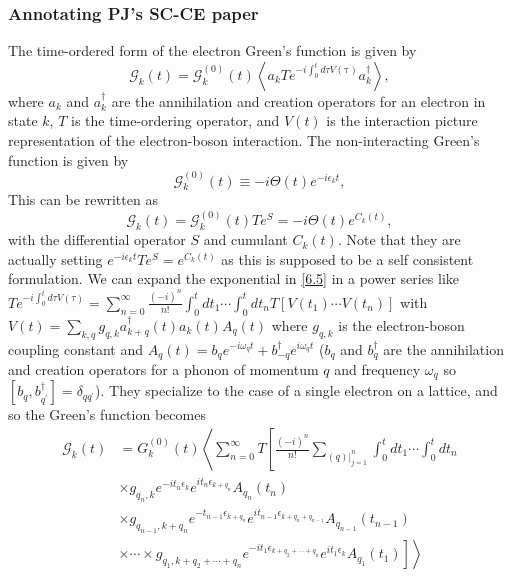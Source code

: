 \subsubsection{Annotating PJ's SC-CE paper}
 The time-ordered form of the electron Green's function is given by
\begin{equation}
\mathcal{G}_k(t)=\mathcal{G}_k^{(0)}(t)\left\langle a_k T e^{-i \int_0^t d \tau V(\mathrm{\tau})} a_k^\dag\right\rangle,
\label{6.5}
\end{equation}
where $a_k$ and $a_k^\dag$ are the annihilation and creation operators for an electron in state $k$, $T$ is the time-ordering operator, and $V(t)$ is the interaction picture representation of the electron-boson interaction. The non-interacting Green's function is given by
\begin{equation}
\mathcal{G}_k^{(0)}(t) \equiv-i \Theta(t) e^{-i \epsilon_k t},
\end{equation}
This can be rewritten as
\begin{equation}
\mathcal{G}_k(t)=\mathcal{G}_k^{(0)}(t) T e^S = -i \Theta(t) e^{C_k(t)},
\end{equation}
with the differential operator $S$ and cumulant $C_k(t)$. Note that they are actually setting $e^{-i \epsilon_k t}Te^S = e^{C_k(t)}$ as this is supposed to be a self consistent formulation. We can expand the exponential in \ref{6.5} in a power series like $T e^{-i \int_0^t d \tau V(\tau)}=\sum_{n=0}^{\infty} \frac{(-i)^n}{n!} \int_0^t d t_1 \cdots \int_0^t d t_n T\left[V ( t _ { 1 } ) \cdots V \left(t_n\right)\right]$ with $V(t)=\sum_{k, q} g_{q, k} a_{k+q}^{\dagger}(t) a_k(t) A_q(t)$ where $g_{q,k}$ is the electron-boson coupling constant and $A_q(t)=b_q e^{-i \omega_q t}+b_{-q}^\dagger e^{i \omega_q t}$ ($b_q$ and $b_q^\dagger$ are the annihilation and creation operators for a phonon of momentum $q$ and frequency $\omega_q$ so $[b_q, b_{q^{\prime}}^{\dagger}]=\delta_{q q^{\prime}}$).
They specialize to the case of a single electron on a lattice, and so the Green's function becomes
\begin{align}
\mathcal{G}_k(t)&=G_k^{(0)}(t)\left\langle \sum_{n=0}^{\infty} T\left[\frac{(-i)^n}{n!} \sum_{\left.(q)\right|_{j=1} ^n} \int_0^t d t_1 \cdots \int_0^t d t_n\right.\right.\\
&\times g_{q_n, k} e^{-i t_n \epsilon_k} e^{i t_n \epsilon _{k+q_{n}}} A_{q_n}\left(t_n\right) \\
&\times g_{q_{n-1}, k+q_n} e^{-t_{n-1} \epsilon_{k+q_n}} e^{i t_{n-1} \epsilon_{k+q_n+q_{n-1}}} A_{q_{n-1}}\left(t_{n-1}\right) \\
&\left.\left.\times \cdots \times g_{q_1, k+q_2+\cdots+q_n} e^{-i t_1 \epsilon_{k+q_2+\cdots+q_n}} e^{i t_1 \epsilon_k} A_{q_1}\left(t_1\right)\right]\right\rangle
\end{align}
